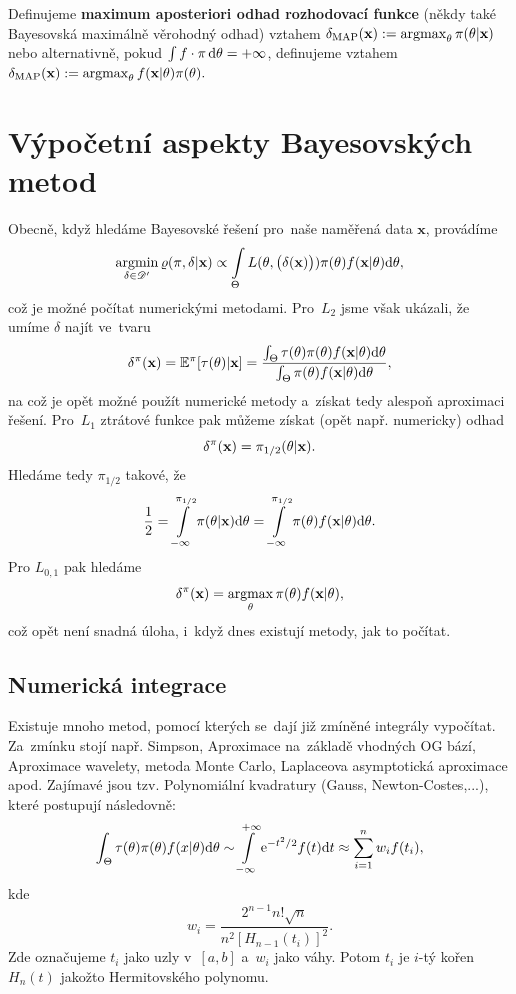 \begin{define}
	Definujeme \textbf{maximum aposteriori odhad rozhodovací funkce} (někdy také Bayesovská maximálně věrohodný odhad) vztahem $\delta_\mathrm{MAP}(\textbf{x}):=\mathop{\mathrm{argmax}}_\theta \pi(\theta|\textbf{x})$ nebo alternativně, pokud $\int f\cdot\pi\,\mathrm{d}\theta=+\infty$, definujeme vztahem  $\delta_\mathrm{MAP}(\textbf{x}):=\mathop{\mathrm{argmax}}_\theta f(\textbf{x}|\theta)\pi(\theta).$
\end{define}

\chapter{Výpočetní aspekty Bayesovských metod}
Obecně, když hledáme Bayesovské řešení pro~naše naměřená data $\textbf{x}$, provádíme 
$$ \mathop{\mathrm{argmin}}\limits_{\delta\in\mathscr{D}'} \varrho(\pi,\delta|\textbf{x})\propto \int\limits_\Theta L(\theta,\big(\delta(\textbf{x})\big))\pi(\theta)f(\textbf{x}|\theta)\mathrm{d}\theta,$$
což je možné počítat numerickými metodami. Pro~$L_2$ jsme však ukázali, že umíme $\delta$ najít ve~tvaru
$$ \delta^\pi(\textbf{x})=\mathbb{E}^\pi[\tau(\theta)|\textbf{x}]=\frac{\int_\Theta \tau(\theta)\pi(\theta)f(\textbf{x}|\theta)\mathrm{d}\theta}{\int_\Theta \pi(\theta)f(\textbf{x}|\theta)\mathrm{d}\theta},$$
na což je opět možné použít numerické metody a~získat tedy alespoň aproximaci řešení. Pro~$L_1$ ztrátové funkce pak můžeme získat (opět např. numericky) odhad
$$ \delta^\pi(\textbf{x})=\pi_{1/2}(\theta|\textbf{x}).$$
Hledáme tedy $\pi_{1/2}$ takové, že 
$$ \frac{1}{2}=\int\limits_{-\infty}^{\pi_{1/2}}\pi(\theta|\textbf{x})\mathrm{d}\theta=\int\limits_{-\infty}^{\pi_{1/2}}\pi(\theta)f(\textbf{x}|\theta)\mathrm{d}\theta.$$
Pro $L_{0,1}$ pak hledáme
$$ \delta^\pi(\textbf{x})=\mathop{\mathrm{argmax}}\limits_{\theta}\pi(\theta)f(\textbf{x}|\theta), $$
což opět není snadná úloha, i~když dnes existují metody, jak to počítat.

\section{Numerická integrace}
Existuje mnoho metod, pomocí kterých se~dají již zmíněné integrály vypočítat. Za~zmínku stojí např. Simpson, Aproximace na~základě vhodných OG bází, Aproximace wavelety, metoda Monte Carlo, Laplaceova asymptotická aproximace apod. Zajímavé jsou tzv. Polynomiální kvadratury (Gauss, Newton-Costes,...), které postupují následovně:
$$ \int_\Theta \tau(\theta)\pi(\theta)f(x|\theta)\mathrm{d}\theta\sim\int\limits_{-\infty}^{+\infty}\mathrm{e}^{-t^2/2}f(t)\mathrm{d} t\approx \sum\limits_{i=1}^{n} w_i f(t_i), $$
kde $$ w_i=\frac{2^{n-1}n!\sqrt{n}}{n^2[H_{n-1}(t_i)]^2}.$$
Zde označujeme $t_i$ jako uzly v~$[a,b]$ a~$w_i$ jako váhy. Potom $t_i$ je $i$-tý kořen $H_n(t)$ jakožto Hermitovského polynomu.


